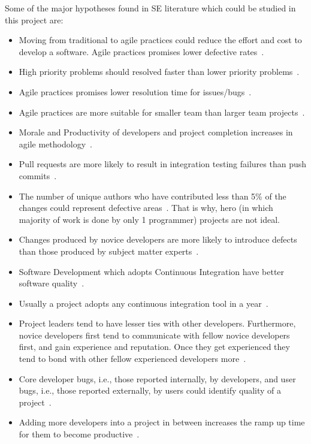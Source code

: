 Some of the major hypotheses found in SE literature which could be studied in this project are:
\begin{itemize}
    \item Moving from traditional to agile practices could reduce the effort and cost to develop a software. Agile practices promises lower defective rates~\cite{moniruzzaman2013comparative}.
    \item High priority problems should resolved faster than lower priority problems~\cite{moniruzzaman2013comparative}.
    \item Agile practices promises lower resolution time for issues/bugs~\cite{mockus2002two}.
    \item Agile practices are more suitable for smaller team than larger team projects~\cite{gandomani2013obstacles}.
    \item Morale and Productivity of developers and project completion  increases  in  agile  methodology~\cite{dybaa2008empirical}.
    \item  Pull requests are more likely to result in integration testing failures than  push  commits~\cite{vasilescu2014continuous}.
    \item The number of unique authors who have contributed less than 5\% of the changes could represent defective areas~\cite{mcintosh2016empirical}. That is why, hero (in which majority of work is done by  only 1 programmer) projects are not ideal.
    \item Changes produced by novice developers are more likely to introduce defects than those produced by subject matter experts~\cite{mcintosh2016empirical}.
    \item Software Development which adopts Continuous Integration have better software quality~\cite{vasilescu2014continuous}.
    \item Usually a project adopts any continuous integration tool in a year~\cite{hilton2016usage}.
    \item Project leaders tend to have lesser ties with other developers. Furthermore, novice developers first tend to communicate with fellow novice developers first, and gain experience and reputation. Once they get experienced they tend to bond with other fellow experienced developers more~\cite{shen2011connects}.
    \item Core developer bugs, i.e., those reported internally, by developers, and user bugs, i.e., those reported externally, by users could identify quality of a project~\cite{vasilescu2015quality}.
    \item Adding more developers into a project in between increases the ramp up time for them to become productive~\cite{brooks1975mythical}.
\end{itemize}
